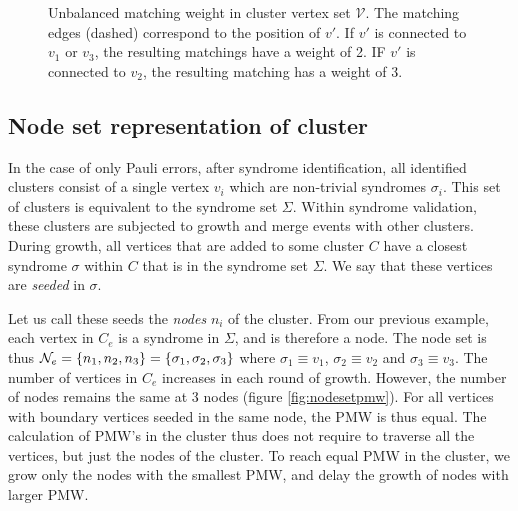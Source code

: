 \begin{figure}[h]
  \centering
  \vspace{1em}
  \caption{Unbalanced matching weight in cluster vertex set $\mathcal{V}$. The matching edges (dashed) correspond to the position of $v'$. If $v'$ is connected to $v_1$ or $v_3$, the resulting matchings have a weight of 2. IF $v'$ is connected to $v_2$, the resulting matching has a weight of 3.}\label{fig:PMW}
\end{figure}

\subsection{Node set representation of cluster}\label{sec:nodeset}

In the case of only Pauli errors, after syndrome identification, all identified clusters consist of a single vertex $v_i$ which are non-trivial syndromes $\sigma_i$. This set of clusters is equivalent to the syndrome set $\Sigma$. Within syndrome validation, these clusters are subjected to growth and merge events with other clusters. During growth, all vertices that are added to some cluster $C$ have a closest syndrome $\sigma$ within $C$ that is in the syndrome set $\Sigma$. We say that these vertices are \emph{seeded} in $\sigma$.

Let us call these seeds the \emph{nodes} $n_i$ of the cluster. From our previous example, each vertex in $C_e$ is a syndrome in $\Sigma$, and is therefore a node. The node set is thus $\mathcal{N}_e = \{n_1, n_2, n_3\} = \{\sigma_1, \sigma_2, \sigma_3\}$ where $\sigma_1 \equiv v_1$, $\sigma_2 \equiv v_2$ and $\sigma_3 \equiv v_3$. The number of vertices in $C_e$ increases in each round of growth. However, the number of nodes remains the same at 3 nodes (figure \ref{fig:nodesetpmw}). For all vertices with boundary vertices seeded in the same node, the PMW is thus equal. The calculation of PMW's in the cluster thus does not require to traverse all the vertices, but just the nodes of the cluster. To reach equal PMW in the cluster, we grow only the nodes with the smallest PMW, and delay the growth of nodes with larger PMW.

